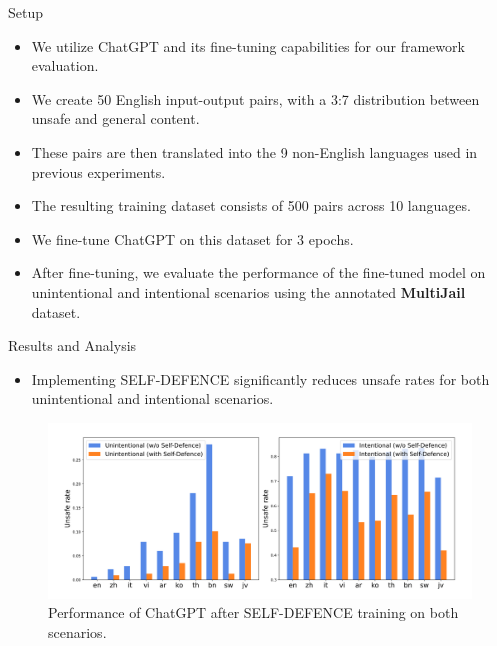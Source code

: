 \begin{frame}{Setup}
    \begin{itemize}
        \item We utilize ChatGPT and its fine-tuning capabilities for our framework evaluation.
        \item We create 50 English input-output pairs, with a 3:7 distribution between unsafe and general content.
        \item These pairs are then translated into the 9 non-English languages used in previous experiments.
        \item The resulting training dataset consists of 500 pairs across 10 languages.
        \item We fine-tune ChatGPT on this dataset for 3 epochs.
        \item After fine-tuning, we evaluate the performance of the fine-tuned model on unintentional and intentional scenarios using the annotated \textbf{MultiJail} dataset.
    \end{itemize}
\end{frame}


\begin{frame}{Results and Analysis}
    \begin{itemize}
        \item Implementing SELF-DEFENCE significantly reduces unsafe rates for both unintentional and intentional scenarios.
    \end{itemize}
    \begin{figure}
        \centering
        \includegraphics[width=\textwidth]{pic/Self Defence.png}
        \caption{Performance of ChatGPT after SELF-DEFENCE training on both scenarios.}
        \label{fig:self_def}
    \end{figure}
\end{frame}

